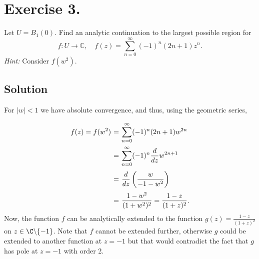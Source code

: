 
\section*{Exercise 3.}

Let $U = B_{1}(0)$. Find an analytic continuation to the largest possible region for
\[
f : U \to \mathbb{C}, \quad f(z) = \sum_{n=0}^{\infty} (-1)^{n} (2n+1) z^{n}.
\]
\textit{Hint:} Consider $f(w^{2})$.

\subsection*{Solution}

For $|w|<1$ we have absolute convergence, and thus, using the geometric series,
\[ \everymath{\displaystyle}
\arraycolsep=1.8pt\def\arraystretch{2.5}
\begin{array}{rcl}
    f(z) = f(w^2) & = & \sum_{n = 0}^{\infty} (-1)^n (2n+1) w^{2n}\\
    & = & \sum_{n = 0}^{\infty} (-1)^n \frac{d}{dz} w^{2n+1}\\
    & = & \frac{d}{dz} \left( \frac{w}{-1-w^2} \right)\\
    & = & \frac{1-w^2}{(1+w^2)^2} = \frac{1-z}{(1+z)^2}.
\end{array} \]
Now, the function $f$ can be analytically extended to the function $g(z) = \frac{1-z}{(1+z)^2}$ on $z \in \C \backslash \{-1\}$. Note that $f$ cannot be extended further, otherwise $g$ could be extended to another function at $z = -1$ but that would contradict the fact that $g$ has pole at $z = -1$ with order 2. 